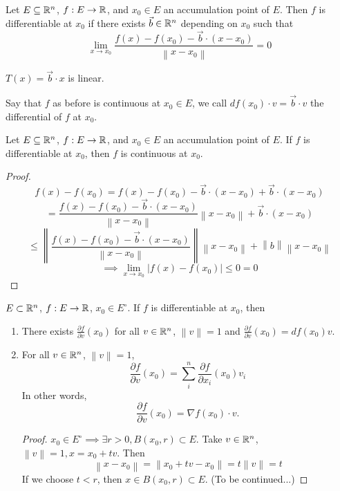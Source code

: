 \documentclass[11pt]{article}
\newcommand{\norm}[1]{\left\lVert #1 \right\rVert}
\newcommand{\ra}{\rightarrow}
\begin{document}
\begin{definition}[Differentiability]
    Let $E \subseteq \mathbb{R}^n$, $f: E \ra \R$, and $x_0 \in E$ an accumulation point of $E$. Then $f$ is differentiable at $x_0$ if there exists $\vec{b} \in \mathbb{R}^n$ depending on $x_0$ such that 
    \[\lim_{x \ra x_0} \frac{f(x) - f(x_0) - \vec{b}\cdot (x-x_0)}{\norm{x-x_0}} = 0\]
\end{definition}

\begin{remark}
    $T(x) = \vec{b} \cdot x$ is linear. 
\end{remark}

\begin{definition}[Differentials]
    Say that $f$ as before is continuous at $x_0 \in E$, we call $df(x_0) \cdot v = \vec{b} \cdot v$ the differential of $f$ at $x_0$.
\end{definition}

\begin{theorem}
    Let $E \subseteq \mathbb{R}^n$, $f: E \ra \R$, and $x_0 \in E$ an accumulation point of $E$. If $f$ is differentiable at $x_0$, then $f$ is continuous at $x_0$.
    \begin{proof}
        \[f(x) - f(x_0) = f(x) - f(x_0) - \vec{b} \cdot (x-x_0) + \vec{b} \cdot (x - x_0)\]
        \[=\frac{f(x) - f(x_0) - \vec{b}\cdot (x-x_0)}{\norm{x-x_0}}\norm{x - x_0} + \vec{b} \cdot (x - x_0) \]
        \[\leq \norm{\frac{f(x) - f(x_0) - \vec{b}\cdot (x-x_0)}{\norm{x-x_0}}}\norm{x-x_0} + \norm{b}\norm{x - x_0}\]
        \[\implies \lim_{x \ra x_0} | f(x) - f(x_0)| \leq 0 = 0\]
    \end{proof}
\end{theorem}

\begin{theorem}
    $E \subset \mathbb{R}^n$, $f: E \ra \R$, $x_0 \in E^\circ$. If $f$ is differentiable at $x_0$, then 
    \begin{enumerate}[label = \roman*)]
        \item There exists $\frac{\partial f}{\partial v}(x_0)$ for all $v \in \mathbb{R}^n$, $\norm{v} = 1$ and $\frac{\partial f}{\partial v}(x_0) = df(x_0)v$.
        \item For all $v \in \mathbb{R}^n$, $\norm{v} = 1$, 
        \[\frac{\partial f}{\partial v}(x_0) = \sum_{i}^{n}\frac{\partial f}{\partial x_i}(x_0)v_i\]
        In other words,
        \[\frac{\partial f}{\partial v}(x_0) = \nabla f(x_0)\cdot v. \]
        \begin{proof}
            $x_0 \in E^\circ \implies \exists r > 0, B(x_0,r) \subset E$. Take $v \in \mathbb{R}^n$, $\norm{v} = 1, x = x_0 + tv$. Then
            \[\norm{x - x_0} = \norm{x_0 + tv - x_0} = t\norm{v} = t\]
            If we choose $t < r$, then $x \in B(x_0,r) \subset E$. (To be continued...)
        \end{proof}
    \end{enumerate}

\end{theorem}
\end{document}
